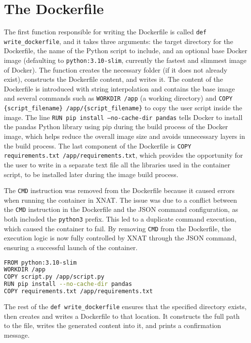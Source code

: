  \section{The Dockerfile}
 
The first function responsible for writing the Dockerfile is called \texttt{def write\_dockerfile}, and it takes three arguments: the target directory for the Dockerfile, the name of the Python script to include, and an optional base Docker image (defaulting to \texttt{python:3.10-slim}, currently the fastest and slimmest image of Docker). The function creates the necessary folder (if it does not already exist), constructs the Dockerfile content, and writes it. The content of the Dockerfile is introduced with string interpolation and contains the base image and several commands such as \texttt{WORKDIR /app} (a working directory) and \texttt{COPY \{script\_filename\} /app/\{script\_filename\}} to copy the user script inside the image. The line \texttt{RUN pip install --no-cache-dir pandas} tells Docker to install the pandas Python library using pip during the build process of the Docker image, which helps reduce the overall image size and avoids unnecessary layers in the build process. The last component of the Dockerfile is \texttt{COPY requirements.txt /app/requirements.txt}, which provides the opportunity for the user to write in a separate text file all the libraries used in the container script, to be installed later during the image build process.


The \texttt{CMD} instruction was removed from the Dockerfile because it caused errors when running the container in XNAT. The issue was due to a conflict between the \texttt{CMD} instruction in the Dockerfile and the JSON command configuration, as both included the \texttt{python3} prefix. This led to a duplicate command execution, which caused the container to fail. By removing \texttt{CMD} from the Dockerfile, the execution logic is now fully controlled by XNAT through the JSON command, ensuring a successful launch of the container.

\begin{lstlisting}[language=bash,caption={Dockerfile}]
FROM python:3.10-slim
WORKDIR /app
COPY script.py /app/script.py
RUN pip install --no-cache-dir pandas
COPY requirements.txt /app/requirements.txt
\end{lstlisting}

The rest of the \texttt{def write\_dockerfile} ensures that the specified directory exists, then creates and writes a Dockerfile to that location. It constructs the full path to the file, writes the generated content into it, and prints a confirmation message.


